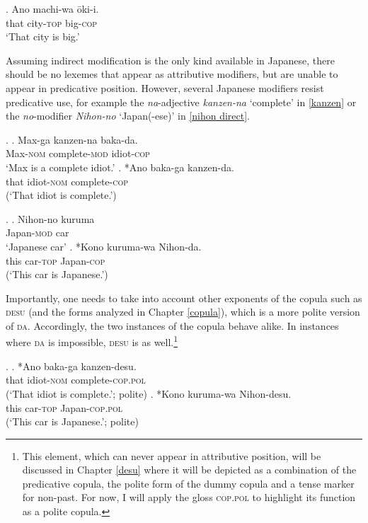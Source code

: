 \documentclass [output=book,colorlinks,citecolor=brown]{langscibook}
\begin{document}
\exg. Ano machi-wa ōki-i.\\
that city-\textsc{top} big-\textsc{cop}\\
`That city is big.’

Assuming indirect modification is the only kind available in Japanese, there should be no lexemes that appear as attributive modifiers, but are unable to appear in predicative position. However, several Japanese modifiers resist predicative use, for example the \textit{na}-adjective \textit{kanzen-na} `complete' in \ref{kanzen} \citep{yamakido:2005:nature} or the \textit{no}-modifier \textit{Nihon-no} `Japan(-ese)’ in \ref{nihon direct}. %

\ex. \label{kanzen} \ag. Max-ga kanzen-na baka-da.\\
Max-\textsc{nom} complete-\textsc{mod} idiot-\textsc{cop}\\
`Max is a complete idiot.' \hfill \citep[68]{yamakido:2005:nature}
\bg. *Ano baka-ga kanzen-da.\\
that idiot-\textsc{nom} complete-\textsc{cop}\\
(`That idiot is complete.’)

\ex. \label{nihon direct} \ag. Nihon-no kuruma\\
Japan-\textsc{mod} car\\
`Japanese car'
\bg. *Kono kuruma-wa Nihon-da.\\
this car-\textsc{top} Japan-\textsc{cop}\\
(`This car is Japanese.’)

Importantly, one needs to take into account other exponents of the copula such as \textsc{desu} (and the forms analyzed in Chapter \ref{copula}), which is a more polite version of \textsc{da}. Accordingly, the two instances of the copula behave alike. In instances where \textsc{da} is impossible, \textsc{desu} is as well.\footnote{This element, which can never appear in attributive position, will be discussed in Chapter \ref{desu} where it will be depicted as a combination of the predicative copula, the polite form of the dummy copula and a tense marker for non-past. For now, I will apply the gloss \textsc{cop.pol} to highlight its function as a polite copula.} %

\newpage

\ex. \ag. *Ano baka-ga kanzen-desu.\\
that idiot-\textsc{nom} complete-\textsc{cop.pol}\\
(`That idiot is complete.’; polite)
\bg. *Kono kuruma-wa Nihon-desu.\\
this car-\textsc{top} Japan-\textsc{cop.pol}\\
(`This car is Japanese.’; polite)
\end{document}
